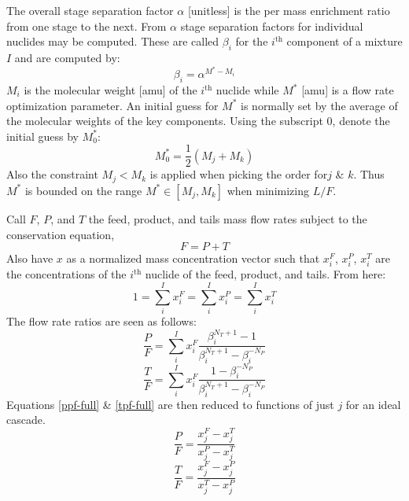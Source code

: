 \documentclass{ansconf}
\newcommand{\ith}[0]{$i^{\mbox{th}}$ }
\begin{document}
The overall stage separation factor $\alpha$ [unitless] is the per mass 
enrichment ratio from one stage to the next.  From $\alpha$ 
stage separation factors for individual nuclides may be computed. 
These are called $\beta_i$ for the \ith component of a mixture $I$ and are 
computed by:
\begin{equation}
\beta_i = \alpha^{M^* - M_i}
\label{beta_i}
\end{equation}
$M_i$ is the molecular weight [amu] of the \ith
nuclide while $M^*$ [amu] is a flow rate optimization parameter.  An initial
guess for 
$M^*$ is normally set by the average of the molecular weights of the key components. 
Using the subscript $0$, denote the initial guess by $M_0^*$:
\begin{equation}
M_0^* = \frac{1}{2}\left(M_j + M_k\right)
\label{mstar-guess}
\end{equation}
Also the constraint $M_j < M_k$ is applied when picking the order for$j$ \& $k$.
Thus $M^*$ is bounded on the range $M^*\in[M_j,M_k]$ when minimizing $L/F$.

Call $F$, $P$, and $T$ the feed, product, and tails mass flow rates subject to 
the conservation equation,
\begin{equation}
F = P + T
\label{total-flow-constraint}
\end{equation}
Also have $x$ as a normalized mass concentration vector such that $x_i^F$, 
$x_i^P$, $x_i^T$ are the concentrations of the \ith nuclide of the feed, product,
and tails.  From here:
\begin{equation}
1 = \sum_i^I x_i^F = \sum_i^I x_i^P = \sum_i^I x_i^T 
\end{equation}
The flow rate ratios are seen as follows:
\begin{equation}
\frac{P}{F} = \sum_i^I x_i^F\frac{\beta_i^{N_T+1} - 1}
                                 {\beta_i^{N_T+1} - \beta_i^{-N_P}}
\label{ppf-full}
\end{equation}
\begin{equation}
\frac{T}{F} = \sum_i^I x_i^F\frac{1 - \beta_i^{-N_P}}
                                 {\beta_i^{N_T+1} - \beta_i^{-N_P}}
\label{tpf-full}
\end{equation}
Equations \ref{ppf-full} \&  \ref{tpf-full} are then reduced to functions
of just $j$ for an ideal cascade.
\begin{equation}
\frac{P}{F} = \frac{x_j^F - x_j^T}{x_j^P - x_j^T}
\label{ppf-key}
\end{equation}
\begin{equation}
\frac{T}{F} = \frac{x_j^F - x_j^P}{x_j^T - x_j^P}
\label{tpf-key}
\end{equation}
\end{document}
